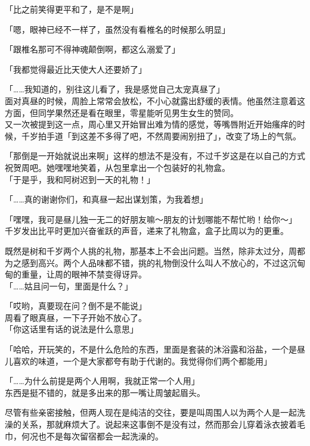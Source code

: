 「比之前笑得更平和了，是不是啊」

「嗯，眼神已经不一样了，虽然没有看椎名的时候那么明显」

「跟椎名那可不得神魂颠倒啊，都这么溺爱了」

「我都觉得最近比天使大人还要娇了」

「……我知道的，别往这儿看了，我是感觉自己太宠真昼了」\\

面对真昼的时候，周脸上常常会放松，不小心就露出舒缓的表情。他虽然注意着这方面，但同学果然还是看在眼里，零星能听见男生女生的赞同。\\

又一次被提到这一点，周心里又开始冒出难为情的感觉，等嘴唇附近开始瘙痒的时候，千岁拍手道「到这差不多得了吧，不然周要闹别扭了」，改变了场上的气氛。

「那倒是一开始就说出来啊」这样的想法不是没有，不过千岁这是在以自己的方式祝贺周吧。她嘿嘿地笑着，从包里拿出一个包装好的礼物盒。\\

「于是乎，我和阿树迟到一天的礼物！」

「……真的谢谢你们，和真昼一起出谋划策，为我着想」

「嘿嘿，我可是昼儿独一无二的好朋友嘛～朋友的计划哪能不帮忙哟！给你～」\\

千岁发出比平时更加兴奋雀跃的声音，递来了礼物盒，盒子比周以为的更重。

既然是树和千岁两个人挑的礼物，那基本上不会出问题。当然，除非太过分，周都为之感到高兴。两个人品味都不错，挑的礼物倒没什么叫人不放心的，不过这沉甸甸的重量，让周的眼神不禁变得讶异。\\

「……姑且问一句，里面是什么？」

「哎哟，真要现在问？倒不是不能说」\\

周看了眼真昼，一下子开始不放心了。\\

「你这话里有话的说法是什么意思」

「哈哈，开玩笑的，不是什么危险的东西，里面是套装的沐浴露和浴盐，一个是昼儿喜欢的味道，一个是大家都夸有助于代谢的。我觉得你们两个都能用」

「……为什么前提是两个人用啊，我就正常一个人用」\\

东西是挺不错的，就是多出来的那一嘴让周皱起眉头。

尽管有些亲密接触，但两人现在是纯洁的交往，要是叫周围人以为两个人是一起洗澡的关系，那就麻烦大了。说起来这事倒不是没有过，然而那会儿穿着泳衣披着毛巾，何况也不是每次留宿都会一起洗澡的。\\

